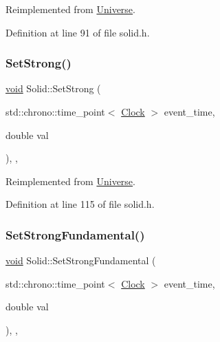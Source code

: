 Reimplemented from \mbox{\hyperlink{class_universe_ae2ae1c3b3e4cde2c18f5f6a814761ec8}{Universe}}.



Definition at line 91 of file solid.\+h.

\mbox{\label{class_solid_a478e15cdf15c5bb01cbcbd5f584ef83a}} 
\subsubsection{\texorpdfstring{Set\+Strong()}{SetStrong()}}
{\footnotesize\ttfamily \mbox{\hyperlink{glad_8h_a950fc91edb4504f62f1c577bf4727c29}{void}} Solid\+::\+Set\+Strong (\begin{DoxyParamCaption}\item[{std\+::chrono\+::time\+\_\+point$<$ \mbox{\hyperlink{universe_8h_a0ef8d951d1ca5ab3cfaf7ab4c7a6fd80}{Clock}} $>$}]{event\+\_\+time,  }\item[{double}]{val }\end{DoxyParamCaption})\hspace{0.3cm}{\ttfamily [inline]}, {\ttfamily [final]}, {\ttfamily [virtual]}}



Reimplemented from \mbox{\hyperlink{class_universe_a5946c8f3d4cda305f3ecd10df21a2f94}{Universe}}.



Definition at line 115 of file solid.\+h.

\mbox{\label{class_solid_a4342786a7785b1a3816d20de02105bcf}} 
\subsubsection{\texorpdfstring{Set\+Strong\+Fundamental()}{SetStrongFundamental()}}
{\footnotesize\ttfamily \mbox{\hyperlink{glad_8h_a950fc91edb4504f62f1c577bf4727c29}{void}} Solid\+::\+Set\+Strong\+Fundamental (\begin{DoxyParamCaption}\item[{std\+::chrono\+::time\+\_\+point$<$ \mbox{\hyperlink{universe_8h_a0ef8d951d1ca5ab3cfaf7ab4c7a6fd80}{Clock}} $>$}]{event\+\_\+time,  }\item[{double}]{val }\end{DoxyParamCaption})\hspace{0.3cm}{\ttfamily [inline]}, {\ttfamily [final]}, {\ttfamily [virtual]}}



